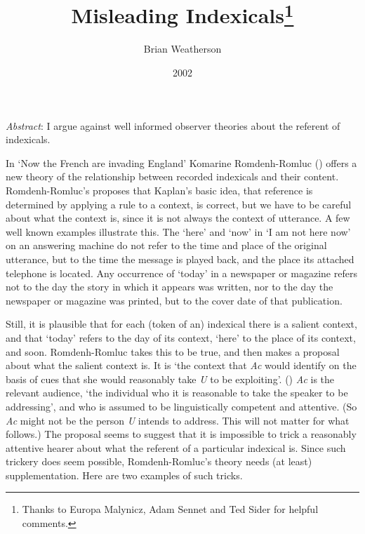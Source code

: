 \documentclass[
  11pt,
  letterpaper,
  DIV=11,
  numbers=noendperiod,
  twoside]{scrartcl}
\title{Misleading Indexicals\thanks{Thanks to Europa Malynicz, Adam
Sennet and Ted Sider for helpful comments.}}
\author{Brian Weatherson}
\date{2002}
\renewenvironment{abstract}
 {\vspace{-1.25cm}
 \quotation\small\noindent\emph{Abstract}:}
 {\endquotation}
\begin{document}
\maketitle
\begin{abstract}
I argue against well informed observer theories about the referent of
indexicals.
\end{abstract}


In `Now the French are invading England' Komarine Romdenh-Romluc
() offers a new theory of the relationship
between recorded indexicals and their content. Romdenh-Romluc's proposes
that Kaplan's basic idea, that reference is determined by applying a
rule to a context, is correct, but we have to be careful about what the
context is, since it is not always the context of utterance. A few well
known examples illustrate this. The `here' and `now' in `I am not here
now' on an answering machine do not refer to the time and place of the
original utterance, but to the time the message is played back, and the
place its attached telephone is located. Any occurrence of `today' in a
newspaper or magazine refers not to the day the story in which it
appears was written, nor to the day the newspaper or magazine was
printed, but to the cover date of that publication.

Still, it is plausible that for each (token of an) indexical there is a
salient context, and that `today' refers to the day of its context,
`here' to the place of its context, and soon. Romdenh-Romluc takes this
to be true, and then makes a proposal about what the salient context is.
It is `the context that \emph{Ac} would identify on the basis of cues
that she would reasonably take \emph{U} to be exploiting'.
() \emph{Ac} is the relevant audience,
`the individual who it is reasonable to take the speaker to be
addressing', and who is assumed to be linguistically competent and
attentive. (So \emph{Ac} might not be the person \emph{U} intends to
address. This will not matter for what follows.) The proposal seems to
suggest that it is impossible to trick a reasonably attentive hearer
about what the referent of a particular indexical is. Since such
trickery does seem possible, Romdenh-Romluc's theory needs (at least)
supplementation. Here are two examples of such tricks.
\end{document}
